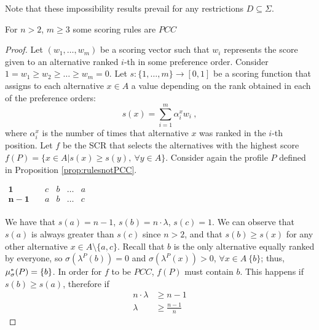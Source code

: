 \documentclass[version=3.21, pagesize, twoside=off, bibliography=totoc, DIV=calc, fontsize=12pt, a4paper]{scrartcl}
\begin{document}
\noindent Note that these impossibility results prevail for any restrictions $D \subseteq \Sigma$. 

\begin{proposition}
	For $n>2$, $m\geq3$ some scoring rules are  $PCC$ 
\end{proposition}
\begin{proof}
	Let $(w_1, \dots, w_m)$ be a scoring vector such that $w_i$ represents the score given to an alternative ranked $i$-th in some preference order. Consider $1 = w_1 \geq w_2 \geq \dots \geq w_{m} = 0$. Let $s:\{1,\dots,m\}\rightarrow [0,1]$ be a scoring function that assigns to each alternative $x \in A$ a value depending on the rank obtained in each of the preference orders: 
	\[ s(x) = \sum_{i=1}^{m} \alpha^{x}_i w_i \ ,\]
	where $\alpha^{x}_i$ is the number of times that alternative $x$ was ranked in the $i$-th position. Let $f$ be the SCR that selects the alternatives with the highest score $f(P)=\{x \in A | s(x)\geq s(y), \ \forall y \in A\}$.
	Consider again the profile $P$ defined in Proposition \ref{prop:rulesnotPCC}.
	\begin{center}
		$
		\begin{array}{ccccc}
		\mathbf{1} \quad &c&b&\dots &a\\
		\mathbf{n-1} \quad &a&b&\dots &c\\		
		\end{array}
		$
	\end{center}
	We have that $s(a)=n-1$, $s(b)=n\cdot \lambda$, $s(c)=1$. We can observe that $s(a)$ is always greater than $s(c)$ since $n>2$, and that $s(b)\geq s(x)$ for any other alternative $x\in A \setminus \{a,c\}$. Recall that $b$ is the only alternative equally ranked by everyone, so $\sigma(\lambda^P(b))=0$ and $\sigma(\lambda^P(x))>0$, $\forall x \in A \ \{b\}$; thus, $\mu_{\sigma}^*(P)=\{b\}$. In order for $f$ to be $PCC$, $f(P)$ must contain $b$. This happens if $s(b)\geq s(a)$, therefore if 
	\begin{align}
	n\cdot\lambda &\geq n-1 \\
	\lambda &\geq \frac{n-1}{n} 
	\end{align}
\end{proof}
\end{document}
